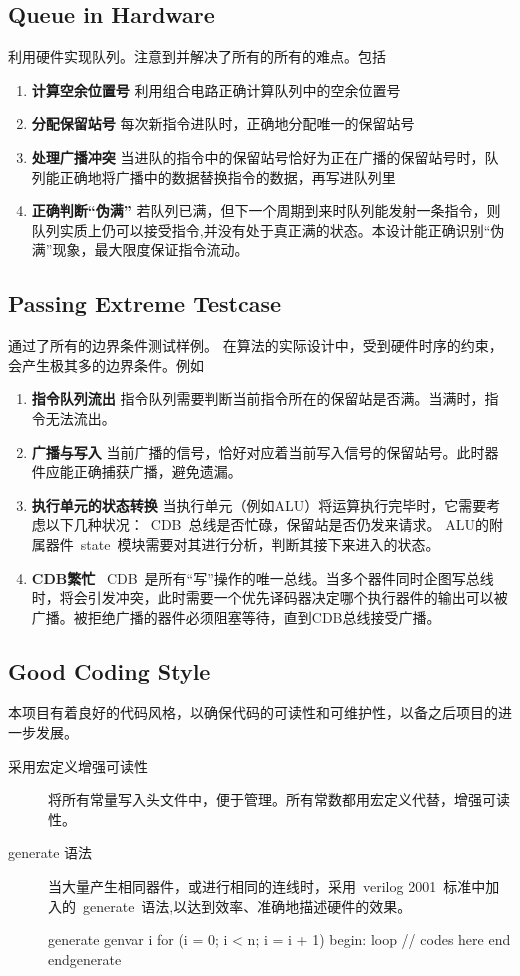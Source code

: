 \documentclass[twoside]{article}
\begin{document}
\subsection{Queue in Hardware}
利用硬件实现队列。注意到并解决了所有的所有的难点。包括 
\begin{enumerate}
	\item \textbf{计算空余位置号   }利用组合电路正确计算队列中的空余位置号
	\item \textbf{分配保留站号   } 每次新指令进队时，正确地分配唯一的保留站号
	\item \textbf{处理广播冲突   }当进队的指令中的保留站号恰好为正在广播的保留站号时，队列能正确地将广播中的数据替换指令的数据，再写进队列里
	\item \textbf{正确判断“伪满”   }若队列已满，但下一个周期到来时队列能发射一条指令，则队列实质上仍可以接受指令,并没有处于真正满的状态。本设计能正确识别“伪满”现象，最大限度保证指令流动。
\end{enumerate} 
  
\subsection{Passing Extreme Testcase} 
通过了所有的边界条件测试样例。  
在算法的实际设计中，受到硬件时序的约束，会产生极其多的边界条件。例如
\begin{enumerate}
	\item \textbf{指令队列流出   }指令队列需要判断当前指令所在的保留站是否满。当满时，指令无法流出。
	\item \textbf{广播与写入   }当前广播的信号，恰好对应着当前写入信号的保留站号。此时器件应能正确捕获广播，避免遗漏。
	\item \textbf{执行单元的状态转换   }当执行单元（例如ALU）将运算执行完毕时，它需要考虑以下几种状况：~CDB~总线是否忙碌，保留站是否仍发来请求。  
	ALU的附属器件~state~模块需要对其进行分析，判断其接下来进入的状态。
	\item \textbf{CDB繁忙   }~CDB~是所有“写”操作的唯一总线。当多个器件同时企图写总线时，将会引发冲突，此时需要一个优先译码器决定哪个执行器件的输出可以被广播。被拒绝广播的器件必须阻塞等待，直到CDB总线接受广播。
\end{enumerate}

\subsection{Good Coding Style}
本项目有着良好的代码风格，以确保代码的可读性和可维护性，以备之后项目的进一步发展。
\begin{description}
	\item[采用宏定义增强可读性]将所有常量写入头文件中，便于管理。所有常数都用宏定义代替，增强可读性。
	\item[generate 语法]当大量产生相同器件，或进行相同的连线时，采用~verilog 2001~标准中加入的~generate~语法,以达到效率、准确地描述硬件的效果。
    \begin{verilogcode}
        generate
            genvar i
            for (i = 0; i < n; i = i + 1) begin: loop
                // codes here
            end
        endgenerate
    \end{verilogcode}
\end{description}
\end{document}
